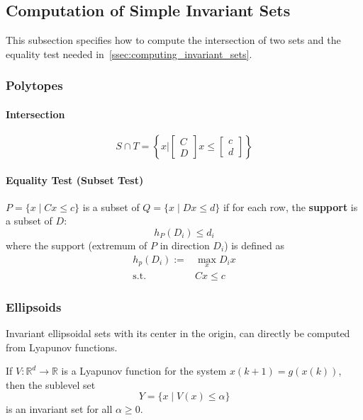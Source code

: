 \subsection{Computation of Simple Invariant Sets}
This subsection specifies how to compute the intersection of two sets and the equality test needed in~\ref{ssec:computing_invariant_sets}.
\subsubsection{Polytopes}
\paragraph{Intersection}
\begin{equation*}
    S \cap T = \left\{x \Bigg|\begin{bmatrix}
        C \\D
    \end{bmatrix}x \leq \begin{bmatrix}
        c \\d
    \end{bmatrix}\right\}
\end{equation*}

\paragraph{Equality Test (Subset Test)}
$P=\{x\mid Cx\leq c\}$ is a subset of $Q=\{x\mid Dx\leq d\}$ if for each row, the \textbf{support} is a subset of $D$:
\begin{equation*}
    h_P(D_i) \leq d_i
\end{equation*}
where the support (extremum of $P$ in direction $D_i$) is defined as
\begin{align*}
    h_p(D_i) :=     & \max_x D_i x \\
    \mathrm{s.t.}\; & Cx\leq c
\end{align*}

\subsubsection{Ellipsoids}
Invariant ellipsoidal sets with its center in the origin, can directly be computed from Lyapunov functions.

\newpar{}
If $V:\mathbb{R}^d\to\mathbb{R}$ is a Lyapunov function for the system $x(k+1)=g(x(k))$, then the sublevel set
\begin{equation*}
    Y = \{x\mid V(x)\leq \alpha\}
\end{equation*}
is an invariant set for all $\alpha \geq 0$.

